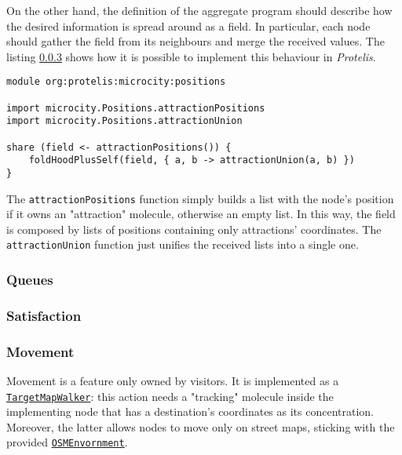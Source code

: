 On the other hand, the definition of the aggregate program should describe how the desired information is spread around as a field. In particular, each node should gather the field from its neighbours and merge the received values. The listing \ref{} shows how it is possible to implement this behaviour in \textit{Protelis}.

\begin{lstlisting}[label=code:protelis-positions, caption=Sharing the coordinates of each attraction to all the nodes that implement this behaviour.]
module org:protelis:microcity:positions

import microcity.Positions.attractionPositions
import microcity.Positions.attractionUnion

share (field <- attractionPositions()) {
    foldHoodPlusSelf(field, { a, b -> attractionUnion(a, b) })
}
\end{lstlisting}

The \texttt{attractionPositions} function simply builds a list with the node's position if it owns an "attraction" molecule, otherwise an empty list. In this way, the field is composed by lists of positions containing only attractions' coordinates. The \texttt{attractionUnion} function just unifies the received lists into a single one.

\subsubsection{Queues}

\subsubsection{Satisfaction}

\subsubsection{Movement}
Movement is a feature only owned by visitors. It is implemented as a \href{https://alchemistsimulator.github.io/reference/kdoc/alchemist/it.unibo.alchemist.model.implementations.actions/-target-map-walker/index.html}{\texttt{TargetMapWalker}}: this action needs a "tracking" molecule inside the implementing node that has a destination's coordinates as its concentration.
Moreover, the latter allows nodes to move only on street maps, sticking with the provided \href{https://alchemistsimulator.github.io/reference/kdoc/alchemist/it.unibo.alchemist.model.implementations.environments/-o-s-m-environment/}{\texttt{OSMEnvornment}}.

